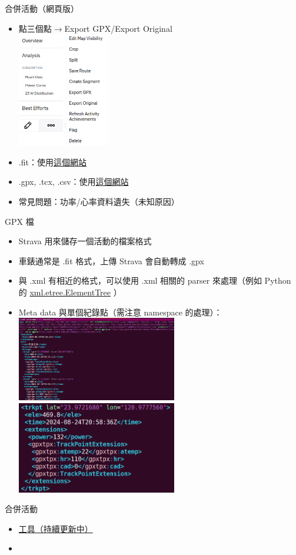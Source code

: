 \begin{frame}[fragile]{合併活動（網頁版）}
\begin{multicols}{2}
\begin{itemize}
\item 點三個點$\to$Export GPX/Export Original\\
\includegraphics[height=5cm]{cropSplit.png}
\item .fit：使用\href{https://www.fitfiletools.com/#/top}{這個網站}
\item .gpx, .tcx, .csv：使用\href{https://gotoes.org/strava/}{這個網站}
\item 常見問題：功率/心率資料遺失（未知原因）
\end{itemize}
\end{multicols}
\end{frame}

\begin{frame}{GPX 檔}
\begin{itemize}
\item Strava 用來儲存一個活動的檔案格式
\item 車錶通常是 .fit 格式，上傳 Strava 會自動轉成 .gpx
\item 與 .xml 有相近的格式，可以使用 .xml 相關的 parser 來處理（例如 Python 的 \href{https://docs.python.org/3/library/xml.etree.elementtree.html}{xml.etree.ElementTree} ）
\item Meta data 與單個紀錄點（需注意 namespace 的處理）：\\
\includegraphics[width=7cm]{gpx1.png}
\includegraphics[width=7cm]{gpx2.png}
\end{itemize}
\end{frame}

\begin{frame}{合併活動}
\begin{itemize}
\item \href{https://github.com/brianhsu7476/activityEditPublish}{工具（持續更新中）}
\item 
\end{itemize}
\end{frame}
